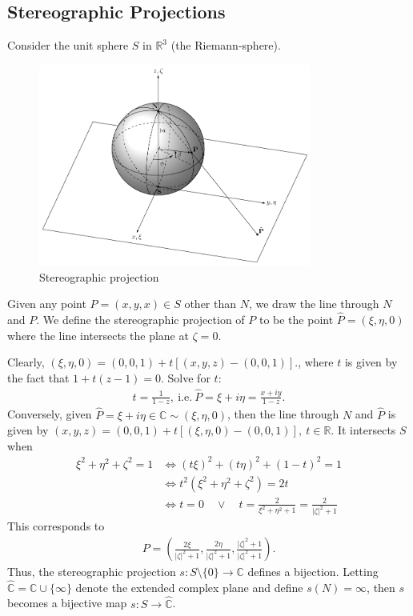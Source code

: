 \documentclass[12pt, a4paper]{article}
\theoremstyle{plain}
\theoremstyle{definition}
\begin{document}
		\subsection{Stereographic Projections} %
		\label{sub:stereographic_projections}
			Consider the unit sphere $S$ in $\mathbb{R}^3$ (the Riemann-sphere). 
			\begin{figure}[H]
			\centering
				\includegraphics[width=0.8\textwidth]{stereographic_projection.png}
				\caption{\label{fig:stereographic_projection}Stereographic projection}
			\end{figure}
			Given any point $P=(x,y,x)\in S$ other than $N$, we draw the line through $N$ and $P$. We define the stereographic projection of $P$ to be the point $\hat{P} = (\xi,\eta,0)$ where the line intersects the plane at $\zeta = 0$.

			Clearly, $(\xi,\eta,0) = (0,0,1)+ t[(x,y,z)-(0,0,1)]$., where $t$ is given by the fact that $1+t(z-1) = 0$. Solve for $t$:
			\begin{align*}
				t = \frac{1}{1-z}, \mathrm{\:i.e.\:} \hat{P} = \xi + i\eta = \frac{x+iy}{1-z}.\tag*{(2)}
			\end{align*}
			Conversely, given $\hat{P}=\xi+i\eta\in \mathbb{C}\sim(\xi,\eta,0)$, then the line through $N$ and $\hat{P}$ is given by $(x,y,z)=(0,0,1)+t[(\xi,\eta,0)-(0,0,1)],\:t\in \mathbb{R}$. It intersects $S$ when
			\begin{align*}
				\xi^2+\eta^2+\zeta^2=1 &\iff (t\xi)^2+(t\eta)^2+(1-t)^2 = 1\\
				&\iff t^2(\xi^2+\eta^2+\zeta^2) = 2t\\
				&\iff t=0\quad \vee\quad t = \frac{2}{\xi^2+\eta^2+1} = \frac{2}{|\zeta|^2+1}
			\end{align*}
			This corresponds to
			\begin{align*}
				P = \left(\frac{2\xi}{|\zeta|^2+1},\frac{2\eta}{|\zeta|^2+1},\frac{|\zeta|^2+1}{|\zeta|^2+1}\right).
			\end{align*}
			Thus, the stereographic projection $s:S\setminus\{0\}\to \mathbb{C}$ defines a bijection. Letting $\hat{\mathbb{C}}=\mathbb{C}\cup\{\infty\}$ denote the extended complex plane and define $s(N) = \infty$, then $s$ becomes a bijective map $s:S\to\hat{\mathbb{C}}$.\\
\end{document}
